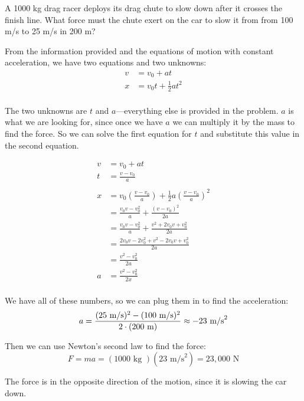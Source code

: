 \documentclass{exam}
\begin{document}
\begin{questions}

\question
A 1000 kg drag racer deploys its drag chute to slow down after it crosses the finish line.  What force must the chute
exert on the car to slow it from from 100 m/s to 25 m/s in 200 m? 

\begin{solution}
From the information provided and the equations of motion with constant acceleration, we have two equations and two unknowns:
\begin{align*}
  v &= v_0 + at \\
  x &= v_0t + \frac{1}{2} at^2 \\
\end{align*}

The two unknowns are $t$ and $a$---everything else is provided in the problem.  $a$ is what we are looking for, since
once we have $a$ we can multiply it by the mass to find the force.  So we can solve the first equation for $t$ and
substitute this value in the second equation.

\begin{align*}
  v &= v_0 + at \\
  t &= \frac{v-v_0}{a} \\
  \\
  x &= v_0 \left( \frac{v-v_0}{a} \right) + \frac{1}{2} a \left( \frac{v-v_0}{a} \right)^2 \\
    &= \frac{v_0v - v_0^2}{a} + \frac{(v-v_0)^2}{2a} \\
    &= \frac{v_0v - v_0^2}{a} + \frac{v^2 + 2v_0v + v_0^2}{2a} \\
    &= \frac{2v_0v - 2v_0^2 + v^2 - 2v_0v + v_0^2}{2a} \\
    &= \frac{v^2 - v_0^2}{2a} \\
  a &= \frac{v^2 - v_0^2}{2x} \\
\end{align*}

We have all of these numbers, so we can plug them in to find the acceleration:
\[
  a = \frac{(25 \text{ m/s})^2 - (100 \text{ m/s})^2}{2 \cdot (200 \text{ m})} \approx -23 \text{ m/s}^2 \\
\]

Then we can use Newton's second law to find the force:
\[
  F = ma = (1000 \text{ kg }) (23 \text{ m/s}^2) = 23,000 \text{ N}
\]

The force is in the opposite direction of the motion, since it is slowing the car down.

\end{solution}


\end{questions}
\end{document}
